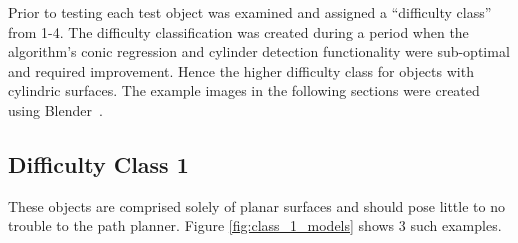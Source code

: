 Prior to testing each test object was examined and assigned a ``difficulty class'' from 1-4.
The difficulty classification was created during a period when the algorithm's conic regression and cylinder detection functionality were sub-optimal and required improvement.
Hence the higher difficulty class for objects with cylindric surfaces.
The example images in the following sections were created using Blender~\cite{Blender}.

\subsection{Difficulty Class 1}
These objects are comprised solely of planar surfaces and should pose little to no trouble to the path planner.
Figure \ref{fig:class_1_models} shows 3 such examples.

